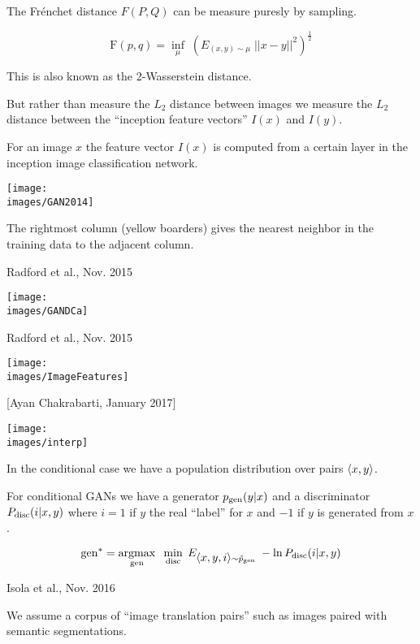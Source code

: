 {

The Fr\'{e}nchet distance $F(P,Q)$ can be measure puresly by sampling.

$$\mathrm{F}(p,q) = \inf_{\mu}\;\left(E_{(x,y)\sim \mu} \;||x-y||^2\right)^{\frac{1}{2}}$$

\vfill
This is also known as the 2-Wasserstein distance.


But rather than measure the $L_2$ distance between images we measure the $L_2$ distance between
the ``inception feature vectors'' $I(x)$ and $I(y)$.

\vfill
For an image $x$ the feature vector $I(x)$ is computed from a certain layer in the inception image classification network.

\centerline{\texttt{[image: \\images/GAN2014]}}
The rightmost column (yellow boarders) gives the nearest neighbor in the training data to the adjacent column.

{Radford et al., Nov. 2015}

\centerline{\texttt{[image: \\images/GANDCa]}}

{Radford et al., Nov. 2015}

\centerline{\texttt{[image: \\images/ImageFeatures]}}


[Ayan Chakrabarti, January 2017]

\centerline{\texttt{[image: \\images/interp]}}

In the conditional case we have a population distribution over pairs ${\mbox{$\langle x,y\rangle$}}$.

\vfill
For conditional GANs we have a generator $p_{\mathrm{gen}}(y|x)$ and a discriminator $P_{\mathrm{disc}}(i|x,y)$
where $i = 1$ if $y$ the real ``label'' for $x$ and $-1$ if $y$ is generated from $x$.

{\color{red} $$\mathrm{gen}^* = \operatorname*{argmax}_{\mathrm{gen}}\;\;\min_{\mathrm{disc}}\;E_{{\mbox{$\langle x,y,i\rangle$}} \sim \tilde{p}_{\mathrm{gen}}}\;-\ln P_{\mathrm{disc}}(i|x,y)$$}

{Isola et al., Nov. 2016}

We assume a corpus of ``image translation pairs'' such as images paired with semantic segmentations.

}
